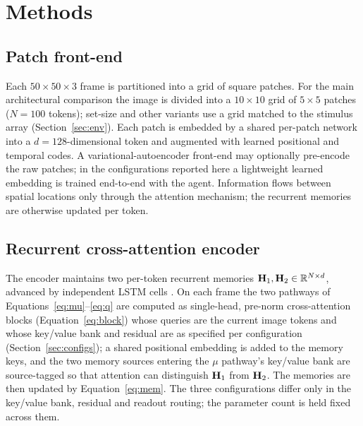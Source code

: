 \section{Methods}
\label{sec:methods}

\subsection{Patch front-end}
Each $50\times50\times3$ frame is partitioned into a grid of square patches. For the
main architectural comparison the image is divided into a $10\times10$ grid of $5\times5$
patches ($N=100$ tokens); set-size and other variants use a grid matched to the stimulus
array (Section~\ref{sec:env}). Each patch is embedded by a shared per-patch network into a
$d=128$-dimensional token and augmented with learned positional and temporal codes. A
variational-autoencoder front-end \citep{kingma2014autoencoding} may optionally pre-encode
the raw patches; in the configurations reported here a lightweight learned embedding is
trained end-to-end with the agent. Information flows between spatial locations only through
the attention mechanism; the recurrent memories are otherwise updated per token.

\subsection{Recurrent cross-attention encoder}
The encoder maintains two per-token recurrent memories $\mathbf{H}_1,\mathbf{H}_2 \in
\mathbb{R}^{N\times d}$, advanced by independent LSTM cells \citep{hochreiter1997long,
beck2024xlstm}. On each frame the two pathways of Equations~\eqref{eq:mu}--\eqref{eq:q} are
computed as single-head, pre-norm cross-attention blocks (Equation~\ref{eq:block}) whose
queries are the current image tokens and whose key/value bank and residual are as specified
per configuration (Section~\ref{sec:configs}); a shared positional embedding is added to the
memory keys, and the two memory sources entering the $\mu$ pathway's key/value bank are
source-tagged so that attention can distinguish $\mathbf{H}_1$ from $\mathbf{H}_2$. The memories are then
updated by Equation~\eqref{eq:mem}. The three configurations differ only in the key/value
bank, residual and readout routing; the parameter count is held fixed across them.

